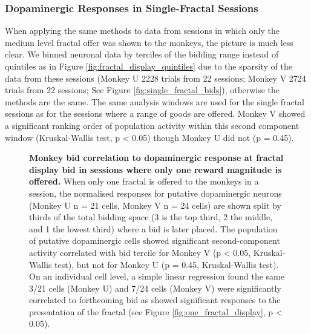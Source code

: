 \subsubsection{Dopaminergic Responses in Single-Fractal Sessions}
\label{subsec:dopamine_single_fractal}

When applying the same methods to data from sessions in which only the medium level fractal offer was shown to the monkeys, the picture is much less clear. We binned neuronal data by terciles of the bidding range instead of quintiles as in Figure \ref{fig:fractal_display_quintiles} due to the sparsity of the data from these sessions (Monkey U 2228 trials from 22 sessions; Monkey V 2724 trials from 22 sessions; See Figure \ref{fig:single_fractal_bids}), otherwise the methods are the same. The same analysis windows are used for the single fractal sessions as for the sessions where a range of goods are offered. Monkey V showed a significant ranking order of population activity within this second component window (Kruskal-Wallis test, p < 0.05) though Monkey U did not (p = 0.45).

\begin{figure}[p] 
\centering    

\caption[Monkey bid correlation to dopaminergic response at fractal display bid in sessions where only one reward magnitude is offered.]{\textbf{Monkey bid correlation to dopaminergic response at fractal display bid in sessions where only one reward magnitude is offered.} When only one fractal is offered to the monkeys in a session, the normalised responses for putative dopaminergic neurons (Monkey U n = 21 cells, Monkey V n = 24 cells) are shown split by thirds of the total bidding space (3 is the top third, 2 the middle, and 1 the lowest third) where a bid is later placed. The population of putative dopaminergic cells showed significant second-component activity correlated with bid tercile for Monkey V (p < 0.05, Kruskal-Wallis test), but not for Monkey U (p = 0.45, Kruskal-Wallis test). On an individual cell level, a simple linear regression found the same 3/21 cells (Monkey U) and 7/24 cells (Monkey V) were significantly correlated to forthcoming bid as showed significant responses to the presentation of the fractal (see Figure \ref{fig:one_fractal_display}, p < 0.05).}
\label{fig:monkey_bid_fractal_display_quintiles_one}
\end{figure}


